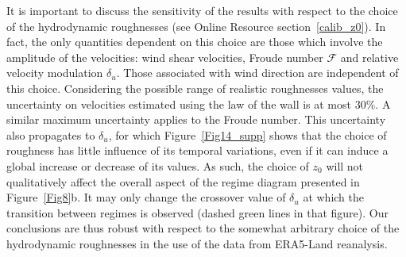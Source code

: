 It is important to discuss the sensitivity of the results with respect to the choice of the hydrodynamic roughnesses (see Online Resource section~\ref{calib_z0}). In fact, the only quantities dependent on this choice are those which involve the amplitude of the velocities: wind shear velocities, Froude number $\mathcal{F}$ and relative velocity modulation $\delta_{u}$. Those associated with wind direction are independent of this choice. Considering the possible range of realistic roughnesses values, the uncertainty on velocities estimated using the law of the wall is at most $30 \%$. A similar maximum uncertainty applies to the Froude number. This uncertainty also propagates to $\delta_{u}$, for which Figure~\ref{Fig14_supp} shows that the choice of roughness has little influence of its temporal variations, even if it can induce a global increase or decrease of its values. As such, the choice of $z_0$ will not qualitatively affect the overall aspect of the regime diagram presented in Figure~\ref{Fig8}b. It may only change the crossover value of $\delta_{u}$ at which the transition between regimes is observed (dashed green lines in that figure). Our conclusions are thus robust with respect to the somewhat arbitrary choice of the hydrodynamic roughnesses in the use of the data from ERA5-Land reanalysis.


